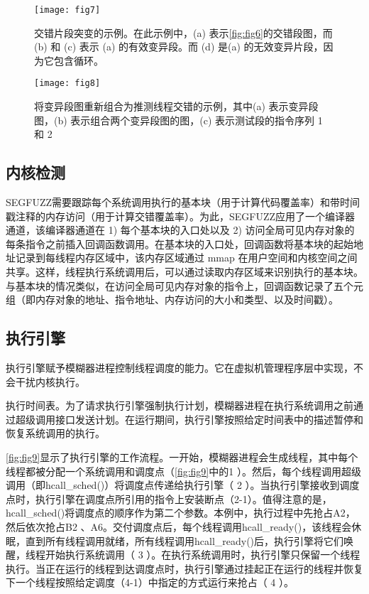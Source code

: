 \begin{figure}[ht]
    \centering
    \texttt{[image: fig7]}
    \caption{\label{fig:fig7}交错片段突变的示例。在此示例中，(a) 表示\autoref{fig:fig6}的交错段图，而 (b) 和 (c) 表示 (a) 的有效变异段。而 (d) 是(a) 的无效变异片段，因为它包含循环。}
\end{figure}

\begin{figure}[ht]
    \centering
    \texttt{[image: fig8]}
    \caption{\label{fig:fig8}将变异段图重新组合为推测线程交错的示例，其中(a) 表示变异段图，(b) 表示组合两个变异段图的图，(c) 表示测试段的指令序列 1 和 2}
\end{figure}

\subsection{内核检测}

SEGFUZZ需要跟踪每个系统调用执行的基本块（用于计算代码覆盖率）和带时间戳注释的内存访问（用于计算交错覆盖率）。为此，SEGFUZZ应用了一个编译器通道，该编译器通道在 1) 每个基本块的入口处以及 2) 访问全局可见内存对象的每条指令之前插入回调函数调用。在基本块的入口处，回调函数将基本块的起始地址记录到每线程内存区域中，该内存区域通过 mmap 在用户空间和内核空间之间共享。这样，线程执行系统调用后，可以通过读取内存区域来识别执行的基本块。与基本块的情况类似，在访问全局可见内存对象的指令上，回调函数记录了五个元组（即内存对象的地址、指令地址、内存访问的大小和类型、以及时间戳）。

\subsection{执行引擎}

执行引擎赋予模糊器进程控制线程调度的能力。它在虚拟机管理程序层中实现，不会干扰内核执行。

执行时间表。为了请求执行引擎强制执行计划，模糊器进程在执行系统调用之前通过超级调用接口发送计划。在运行期间，执行引擎按照给定时间表中的描述暂停和恢复系统调用的执行。

\autoref{fig:fig9}显示了执行引擎的工作流程。一开始，模糊器进程会生成线程，其中每个线程都被分配一个系统调用和调度点（\autoref{fig:fig9}中的1 ）。然后，每个线程调用超级调用（即hcall\_sched()）将调度点传递给执行引擎（ 2 ）。当执行引擎接收到调度点时，执行引擎在调度点所引用的指令上安装断点（2-1）。值得注意的是， hcall\_sched()将调度点的顺序作为第二个参数。本例中，执行过程中先抢占A2，然后依次抢占B2 、A6。交付调度点后，每个线程调用hcall\_ready()，该线程会休眠，直到所有线程调用就绪，所有线程调用hcall\_ready()后，执行引擎将它们唤醒，线程开始执行系统调用（ 3 ）。在执行系统调用时，执行引擎只保留一个线程执行。当正在运行的线程到达调度点时，执行引擎通过挂起正在运行的线程并恢复下一个线程按照给定调度（4-1）中指定的方式运行来抢占（ 4 ）。

